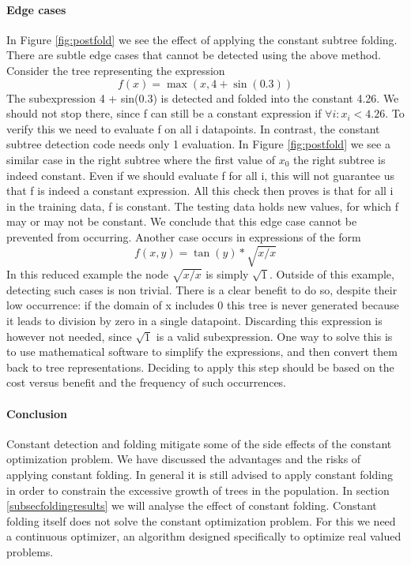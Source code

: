 \paragraph{Edge cases}
In Figure \ref{fig:postfold} we see the effect of applying the constant subtree folding. 
There are subtle edge cases that cannot be detected using the above method. Consider the tree representing the expression
\[
f(x) = \max(x, 4 + \sin(0.3)) 
\]
The subexpression 4 + sin(0.3) is detected and folded into the constant 4.26. 
We should not stop there, since f can still be a constant expression if $\forall i :  x_i < 4.26$. To verify this we need to evaluate f on all i datapoints. In contrast, the constant subtree detection code needs only 1 evaluation. In Figure \ref{fig:postfold} we see a similar case in the right subtree where the first value of $x_0$ the right subtree is indeed constant. 
Even if we should evaluate f for all i, this will not guarantee us that f is indeed a constant expression. All this check then proves is that for all i in the training data, f is constant. The testing data holds new values, for which f may or may not be constant. We conclude that this edge case cannot be prevented from occurring.
Another case occurs in expressions of the form 
\[
f(x, y) = \tan(y) * \sqrt{x/x}
\]
In this reduced example the node $\sqrt{x/x}$ is simply $\sqrt{1}$. Outside of this example, detecting such cases is non trivial. There is a clear benefit to do so, despite their low occurrence: if the domain of x includes 0 this tree is never generated because it leads to division by zero in a single datapoint. Discarding this expression is however not needed, since $\sqrt{1}$ is a valid subexpression. One way to solve this is to use mathematical software to simplify the expressions, and then convert them back to tree representations. Deciding to apply this step should be based on the cost versus benefit and the frequency of such occurrences. 

\paragraph{Conclusion}
Constant detection and folding mitigate some of the side effects of the constant optimization problem. We have discussed the advantages and the risks of applying constant folding. In general it is still advised to apply constant folding in order to constrain the excessive growth of trees in the population. In section \ref{subsecfoldingresults}
we will analyse the effect of constant folding.
Constant folding itself does not solve the constant optimization problem.
For this we need a continuous optimizer, an algorithm designed specifically to optimize real valued problems.

